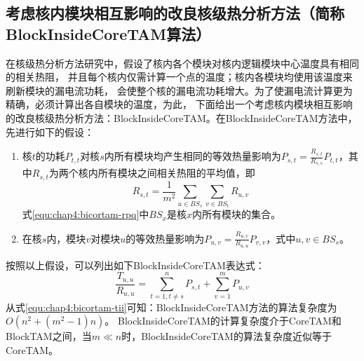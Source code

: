 \subsection{考虑核内模块相互影响的改良核级热分析方法（简称BlockInsideCoreTAM算法）}
在核级热分析方法研究中，假设了核内各个模块对核内逻辑模块中心温度具有相同的相关热阻， 并且每个核内仅需计算一个点的温度；核内各模块均使用该温度来刷新模块的漏电流功耗， 会使整个核的漏电流功耗增大。为了使漏电流计算更为精确，必须计算出各自模块的温度，为此， 下面给出一个考虑核内模块相互影响的改良核级热分析方法：BlockInsideCoreTAM。在BlockInsideCoreTAM方法中， 先进行如下的假设：
\begin{enumerate}[1)]
\item 核$t$的功耗$P_{t,t}$对核$s$内所有模块均产生相同的等效热量影响为$P_{s,t} = \frac{R_{s,t}}{R_{s,s}}P_{t,t}$，其中$R_{s,t}$为两个核内所有模块之间相关热阻的平均值，即
\begin{equation}
\label{equ:chap4:bicortam-rpq}
R_{s,t} = \frac{1}{m^2}\sum\limits_{u \in BS_s}\sum\limits_{v \in BS_t}R_{u,v}
\end{equation}
式\ref{equ:chap4:bicortam-rpq}中$BS_x$是核$x$内所有模块的集合。
\item 在核$s$内，模块$v$对模块$u$的等效热量影响为$P_{u,v} = \frac{R_{u,v}}{R_{u,u}}P_{v,v}$，式中$u,v \in BS_s$。
\end{enumerate}
按照以上假设，可以列出如下BlockInsideCoreTAM表达式：
\begin{equation}
\label{equ:chap4:bicortam-tii}
\frac{T_{u,u}}{R_{u,u}} = \sum\limits_{t=1,t\neq s}^n P_{s,t} + \sum\limits_{v=1}^m P_{u,v}
\end{equation}
从式\ref{equ:chap4:bicortam-tii}可知：BlockInsideCoreTAM方法的算法复杂度为$O(n^2+(m^2-1)n)$。 BlockInsideCoreTAM的计算复杂度介于CoreTAM和BlockTAM之间，当$m \ll n$时，BlockInsideCoreTAM的算法复杂度近似等于CoreTAM。

